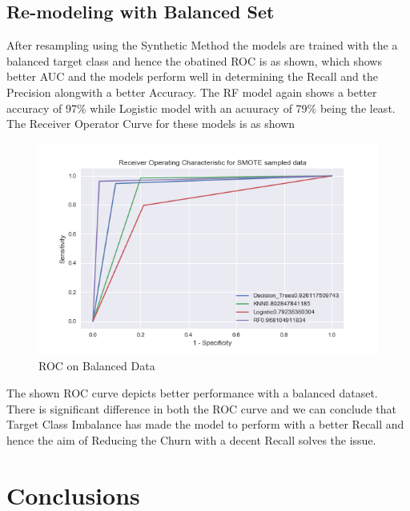 \documentclass[a4paper,12pt]{report}
\begin{document}
\section{Re-modeling with Balanced Set}
After resampling using the Synthetic Method the models are trained with the a balanced target class and hence the obatined ROC is as shown, which shows better AUC and the models perform well in determining the Recall and the Precision alongwith a better Accuracy. The RF model again shows  a better accuracy of 97\% while Logistic model with an acuuracy of 79\% being the least. The Receiver Operator Curve for these models is as shown \\
\begin{figure}[!htbp]
\vspace{-100pt}
\centering
\includegraphics[scale = 0.8]{Balanced_ROC.PNG}
\caption{ROC on Balanced Data}
\label{fig:3.6}
\end{figure}
\FloatBarrier
The shown ROC curve depicts better performance with a balanced dataset. There is significant difference in both the ROC curve and we can conclude that Target Class Imbalance has made the model to perform with a better Recall and hence the aim of Reducing the Churn with a decent Recall solves the issue.


\chapter{Conclusions}
\end{document}

